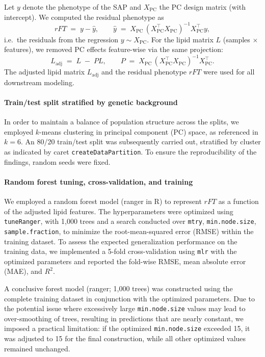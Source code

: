 \documentclass[10pt,letterpaper]{article}
\begin{document}
Let \(y\) denote the phenotype of the SAP and \(X_{\mathrm{PC}}\) the PC design matrix (with intercept). We computed the residual phenotype as
\[
rFT \;=\; y - \hat{y}, 
\qquad 
\hat{y} \;=\; X_{\mathrm{PC}}\,(X_{\mathrm{PC}}^{\top}X_{\mathrm{PC}})^{-1}X_{\mathrm{PC}}^{\top}y,
\]
i.e.\ the residuals from the regression \(y \sim X_{\mathrm{PC}}\).
For the lipid matrix \(L\) (samples \(\times\) features), we removed PC effects feature-wise via the same projection:
\[
L_{\mathrm{adj}} \;=\; L \;-\; P L,
\qquad
P \;=\; X_{\mathrm{PC}}\,(X_{\mathrm{PC}}^{\top}X_{\mathrm{PC}})^{-1}X_{\mathrm{PC}}^{\top}.
\]
The adjusted lipid matrix \(L_{\mathrm{adj}}\) and the residual phenotype \(rFT\) were used for all downstream modeling.

\paragraph{Train/test split stratified by genetic background}
In order to maintain a balance of population structure across the splits, we employed \(k\)-means clustering in principal component (PC) space, as referenced in \(k=6\). An 80/20 train/test split was subsequently carried out, stratified by cluster as indicated by caret \texttt{createDataPartition}. To ensure the reproducibility of the findings, random seeds were fixed.

\paragraph{Random forest tuning, cross-validation, and training}
We employed a random forest model (ranger in R) to represent \(rFT\) as a function of the adjusted lipid features. The hyperparameters were optimized using \texttt{tuneRanger}, with 1,000 trees and a search conducted over \texttt{mtry}, \texttt{min.node.size}, \texttt{sample.fraction}, to minimize the root-mean-squared error (RMSE) within the training dataset. To assess the expected generalization performance on the training data, we implemented a 5-fold cross-validation using \texttt{mlr} with the optimized parameters and reported the fold-wise RMSE, mean absolute error (MAE), and \(R^2\).

A conclusive forest model (ranger; 1,000 trees) was constructed using the complete training dataset in conjunction with the optimized parameters. Due to the potential issue where excessively large \texttt{min.node.size} values may lead to over-smoothing of trees, resulting in predictions that are nearly constant, we imposed a practical limitation: if the optimized \texttt{min.node.size} exceeded 15, it was adjusted to 15 for the final construction, while all other optimized values remained unchanged.
\end{document}
